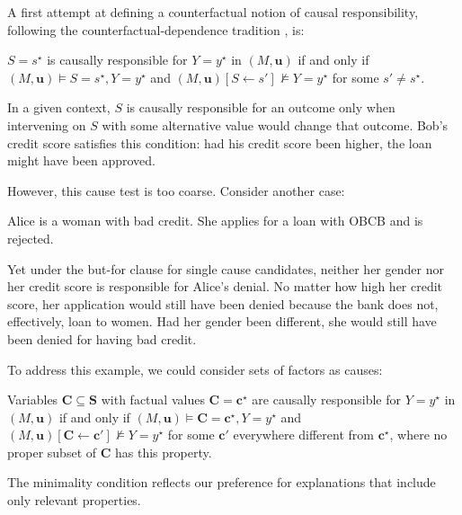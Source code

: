 A first attempt at defining a counterfactual notion of causal responsibility,
following the counterfactual-dependence tradition \citep{lewis1973causation,
actualCausalityHalpern}, is:
\begin{definition}
$S=s^\star$ is causally responsible for  $Y=y^\star$  in $(M, \mathbf{u})$ if and only if $(M, \mathbf{u}) \vDash S=s^\star, Y=y^\star$ and $(M, \mathbf{u})[S \leftarrow s'] \not \vDash Y=y^\star$ for some $s' \neq s^\star$.
\end{definition}

\noindent 
In a given context, $S$ is causally responsible for an outcome only when intervening on $S$ with some alternative value would change that outcome. 
Bob’s credit score satisfies this condition: had his credit score been higher, the loan might have been approved. 


However, this cause test is too coarse. Consider another case:
\begin{example} \label{example:aliceatobcb}
Alice is a woman with bad credit.
She applies for a loan with OBCB and is rejected.
\end{example}
\noindent Yet under the but-for clause for single cause candidates, neither her gender nor her credit score is responsible for Alice's denial.
No matter how high her credit score, her application would still have been denied because the bank does not, effectively, loan to women.
Had her gender been different, she would still have been denied for having bad credit.

To address this example, we could consider sets of factors as causes:
\begin{attempt}
Variables $\mathbf{C}\subseteq \mathbf{S}$ with factual values $\mathbf{C} = \mathbf{c}^\star$ 
are causally responsible for $Y = y^\star$ in $(M, \mathbf{u})$ if and only if 
$(M, \mathbf{u}) \vDash \mathbf{C} = \mathbf{c}^\star, Y = y^\star$ and $(M, \mathbf{u})[\mathbf{C} \leftarrow \mathbf{c'}] \not \vDash Y= y ^\star$ for some $\mathbf{c'}$ everywhere different from $\mathbf{c}^\star$, where no proper subset of $\mathbf{C}$ has this property. 
\end{attempt}

\noindent The minimality condition reflects our preference for explanations that include only relevant properties.

